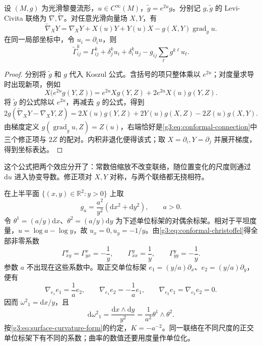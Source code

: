 \begin{proposition}\label{g3:prop:conformal-connection}
	设 \((M,g)\) 为光滑黎曼流形，\(u\in C^\infty(M)\)，\(\widetilde g=e^{2u}g\)。分别记 \(g,\widetilde g\) 的 Levi-Civita 联络为 \(\nabla,\widetilde\nabla\)。对任意光滑向量场 \(X,Y\)，有
	\begin{equation}\label{g3:eq:conformal-connection}
		\widetilde\nabla_XY
		=\nabla_XY+X(u)Y+Y(u)X-g(X,Y)\operatorname{grad}_g u.
	\end{equation}
	在同一局部坐标中，令 \(u_i=\partial_i u\)，则
	\begin{equation}\label{g3:eq:conformal-christoffel}
		\widetilde\Gamma^k_{ij}
		=\Gamma^k_{ij}+\delta^k_j u_i+\delta^k_i u_j
		-g_{ij}\sum_\ell g^{k\ell}u_\ell.
	\end{equation}
\end{proposition}
\begin{proof}
	分别将 \(\widetilde g\) 和 \(g\) 代入 Koszul 公式。含括号的项只整体乘以 \(e^{2u}\)；对度量求导时出现新项，例如
	\[
		X\bigl(e^{2u}g(Y,Z)\bigr)
		=e^{2u}Xg(Y,Z)+2e^{2u}X(u)g(Y,Z).
	\]
	将 \(\widetilde g\) 的公式除以 \(e^{2u}\)，再减去 \(g\) 的公式，得到
	\[
		2g(\widetilde\nabla_XY-\nabla_XY,Z)
		=2X(u)g(Y,Z)+2Y(u)g(X,Z)-2Z(u)g(X,Y).
	\]
	由梯度定义 \(g(\operatorname{grad}_g u,Z)=Z(u)\)，右端恰好是\eqref{g3:eq:conformal-connection}中三个修正项与 \(2Z\) 的配对。内积非退化便得该式；取 \(X=\partial_i,Y=\partial_j\) 并展开梯度，得到坐标表达。
\end{proof}

这个公式把两个效应分开了：常数倍缩放不改变联络，随位置变化的尺度则通过 \(\mathrm du\) 进入协变导数。修正项对 \(X,Y\) 对称，与两个联络都无挠相符。

\begin{example}\label{g3:exm:half-plane-connection}
	在上半平面 \(\{(x,y)\in\mathbb R^2:y>0\}\) 上取
	\[
		g_a=\frac{a^2}{y^2}(\mathrm dx^2+\mathrm dy^2),\qquad a>0.
	\]
	令 \(\theta^1=(a/y)\mathrm dx\)、\(\theta^2=(a/y)\mathrm dy\) 为下述单位标架的对偶余标架。相对于平坦度量，\(u=\log a-\log y\)，故 \(u_x=0,u_y=-1/y\)。由\eqref{g3:eq:conformal-christoffel}得全部非零系数
	\[
		\Gamma^x_{xy}=\Gamma^x_{yx}=-\frac1y,\qquad
		\Gamma^y_{xx}=\frac1y,\qquad
		\Gamma^y_{yy}=-\frac1y.
	\]
	参数 \(a\) 不出现在这些系数中。取正交单位标架 \(e_1=(y/a)\partial_x\)、\(e_2=(y/a)\partial_y\)，便有
	\[
		\nabla_{e_1}e_1=\frac1a e_2,\qquad
		\nabla_{e_1}e_2=-\frac1a e_1,\qquad
		\nabla_{e_2}e_1=\nabla_{e_2}e_2=0.
	\]
	因而 \(\omega^2{}_1=\mathrm dx/y\)，且
	\[
		\mathrm d\omega^2{}_1
		=\frac{\mathrm dx\wedge\mathrm dy}{y^2}
		=\frac1{a^2}\theta^1\wedge\theta^2.
	\]
	按\eqref{g3:eq:surface-curvature-form}的约定，\(K=-a^{-2}\)。同一联络在不同尺度的正交单位标架下有不同的系数；曲率的数值还要用度量作单位化。
\end{example}

